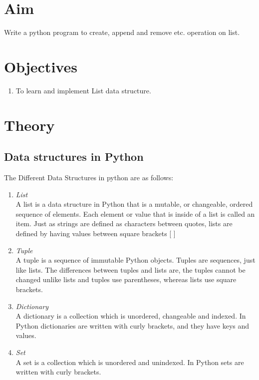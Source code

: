 \documentclass[11pt]{article}
\begin{document}
\tableofcontents
\thispagestyle{empty}
\clearpage

\setcounter{page}{1}

\section{Aim}
Write a python program to create, append and remove etc. operation on list.

\section{Objectives}
\begin{enumerate}
	\item To learn and implement List data structure.
\end{enumerate}

\section{Theory}

\subsection{Data structures in Python}
The Different Data Structures in python are as follows:
\begin{enumerate}
	\item \textit{List}\\
	      A list is a data structure in Python that is a mutable, or changeable, ordered sequence of elements. Each element or value that is inside of a list is called an item. Just as strings are defined as characters between quotes, lists are defined by having values between square brackets [ ]
	\item \textit{Tuple}\\
	      A tuple is a sequence of immutable Python objects. Tuples are sequences, just like lists. The differences between tuples and lists are, the tuples cannot be changed unlike lists and tuples use parentheses, whereas lists use square brackets.
	\item \textit{Dictionary}\\
	      A dictionary is a collection which is unordered, changeable and indexed. In Python dictionaries are written with curly brackets, and they have keys and values.
	\item \textit{Set}\\
	      A set is a collection which is unordered and unindexed. In Python sets are written with curly brackets.
\end{enumerate}
\end{document}
